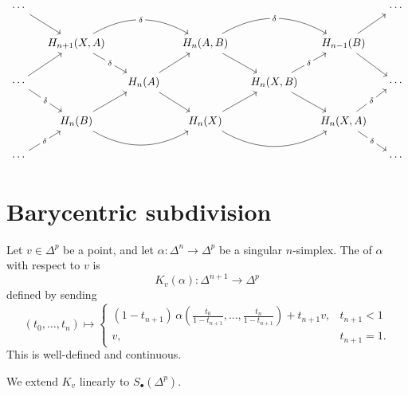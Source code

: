 \documentclass[main.tex]{subfiles}
\begin{document}
\begin{equation*}
  \begin{tikzcd}[column sep=small]
    \cdots
    \arrow[dr]
    &&&&&& \cdots
    \\
    & H_{n+1}(X, A)
    \arrow[rr, bend left, overlay, "\delta" description]
    \arrow[dr, "\delta" description]
    && H_{n}(A, B)
    \arrow[rr, bend left, overlay, "\delta" description]
    \arrow[dr]
    && H_{n-1}(B)
    \arrow[ur]
    \arrow[dr]
    \\
    \cdots
    \arrow[ur]
    \arrow[dr, "\delta" description]
    && H_{n}(A)
    \arrow[ur]
    \arrow[dr]
    && H_{n}(X, B)
    \arrow[ur, "\delta" description]
    \arrow[dr]
    && \cdots
    \\
    & H_{n}(B)
    \arrow[rr, bend right]
    \arrow[ur]
    && H_{n}(X)
    \arrow[rr, bend right]
    \arrow[ur]
    && H_{n}(X, A)
    \arrow[ur, "\delta" description]
    \arrow[dr, "\delta" description]
    \\
    \cdots
    \arrow[ur, "\delta" description]
    &&&&&& \cdots
  \end{tikzcd}
\end{equation*}

\section{Barycentric subdivision}
\label{sec:barycentric_subdivision}

\begin{definition}
  \label{def:cone_maps}
  Let \(v \in \Delta^{p}\) be a point, and let \(\alpha\colon \Delta^{n} \to \Delta^{p}\) be a singular \(n\)-simplex. The  of \(\alpha\) with respect to \(v\) is
  \begin{equation*}
    K_{v}(\alpha)\colon \Delta^{n+1} \to \Delta^{p}
  \end{equation*}
  defined by sending
  \begin{equation*}
    (t_{0}, \ldots, t_{n}) \mapsto
    \begin{cases}
      (1 - t_{n+1})\, \alpha(\frac{t_{0}}{1-t_{n+1}}, \ldots, \frac{t_{n}}{1-t_{n+1}}) + t_{n+1}v, &t_{n+1} < 1 \\
      v, & t_{n+1} = 1.
    \end{cases}
  \end{equation*}
  This is well-defined and continuous.

  We extend \(K_{v}\) linearly to \(S_{\bullet}(\Delta^{p})\).
\end{definition}
\end{document}
